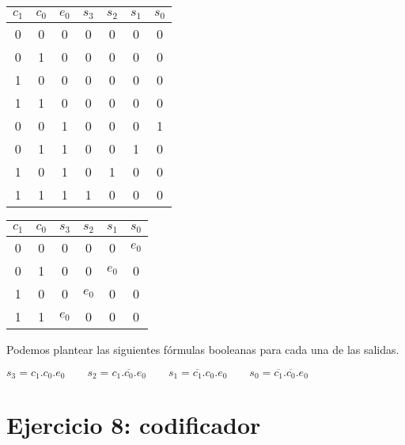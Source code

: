 \begin{multicols}{2}
    \begin{tabular}{|c|c|c||c|c|c|c|}
        $c_1$ & $c_0$ & $e_0$ & $s_3$ & $s_2$ & $s_1$ & $s_0$ \\
        \hline
        0 & 0 & 0 & 0 & 0 & 0 & 0 \\
        0 & 1 & 0 & 0 & 0 & 0 & 0 \\
        1 & 0 & 0 & 0 & 0 & 0 & 0 \\
        1 & 1 & 0 & 0 & 0 & 0 & 0 \\
        0 & 0 & 1 & 0 & 0 & 0 & 1 \\
        0 & 1 & 1 & 0 & 0 & 1 & 0 \\
        1 & 0 & 1 & 0 & 1 & 0 & 0 \\
        1 & 1 & 1 & 1 & 0 & 0 & 0 \\
    \end{tabular}

    \begin{tabular}{|c|c||c|c|c|c|}
        $c_1$ & $c_0$ & $s_3$ & $s_2$ & $s_1$ & $s_0$ \\
        \hline
        0 & 0 & 0 & 0 & 0 & $e_0$ \\
        0 & 1 & 0 & 0 & $e_0$ & 0 \\
        1 & 0 & 0 & $e_0$ & 0 & 0 \\
        1 & 1 & $e_0$ & 0 & 0 & 0 \\
    \end{tabular}
\end{multicols}

Podemos plantear las siguientes fórmulas booleanas para cada una de las salidas.

$
s_3 = c_1.c_0.e_0
\hspace{2em}
s_2 = c_1.\overline{c_0}.e_0
\hspace{2em}
s_1 = \overline{c_1}.c_0.e_0
\hspace{2em}
s_0 = \overline{c_1}.\overline{c_0}.e_0
$

\begin{figure}[ht]
    
\end{figure}

\pagebreak

\section{Ejercicio 8: codificador}

\subsection{}

